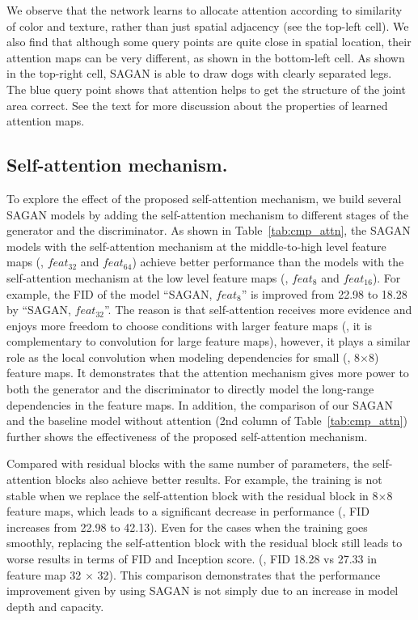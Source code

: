 \documentclass{article}
\begin{document}
\begin{figure*}[tb]
{    We observe that the network learns to allocate attention according to similarity of color and texture, rather than just spatial adjacency (see the top-left cell). 
We also find that although some query points are quite close in spatial location, their attention maps can be very different, as shown in the bottom-left cell. 
As shown in the top-right cell, SAGAN is able to draw dogs with clearly separated legs. 
    The blue query point shows that attention helps to get the structure of the joint area correct. 
    See the text for more discussion about the properties of learned attention maps. 
    }
\label{fig:attention}
    \vspace{-8pt}
 \end{figure*}


\subsection{Self-attention mechanism.} \label{sec:sagan_component}

To explore the effect of the proposed self-attention mechanism, we build several SAGAN models by adding the self-attention mechanism to different stages of the generator and the discriminator. As shown in Table~\ref{tab:cmp_attn}, the SAGAN models with the self-attention mechanism at the middle-to-high level feature maps (\eg, $feat_{32}$ and $feat_{64}$) achieve better performance than the models with the self-attention mechanism at the low level feature maps (\eg, $feat_{8}$ and $feat_{16}$). For example, the FID of the model ``SAGAN, $feat_{8}$'' is improved from 22.98 to 18.28 by ``SAGAN, $feat_{32}$''. The reason is that self-attention receives more evidence and enjoys more freedom to choose conditions with larger feature maps (\ie, it is complementary to convolution for large feature maps), however, it plays a similar role as the local convolution when modeling dependencies for small (\eg, 8$\times$8) feature maps. It demonstrates that the attention mechanism gives more power to both the generator and the discriminator to directly model the long-range dependencies in the feature maps. In addition, the comparison of our SAGAN and the baseline model without attention (2nd column of Table~\ref{tab:cmp_attn}) further shows the effectiveness of the proposed self-attention mechanism.


Compared with residual blocks with the same number of parameters, the self-attention blocks also achieve better results. For example, the training is not stable when we replace the self-attention block with the residual block in 8$\times$8 feature maps, which leads to a significant decrease in performance (\eg, FID increases from 22.98 to 42.13). Even for the cases when the training goes smoothly, replacing the self-attention block with the residual block still leads to worse results in terms of FID and Inception score. (\eg, FID 18.28 vs 27.33 in feature map 32 $\times$ 32). This comparison demonstrates that the performance improvement given by using SAGAN is not simply due to an increase in model depth and capacity. 
\end{document}
